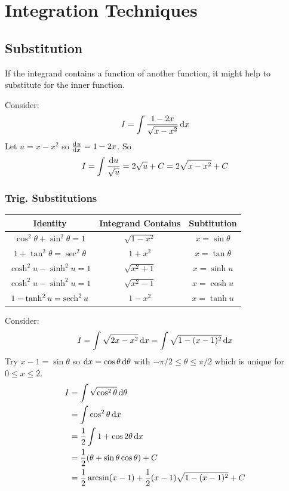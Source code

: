 \documentclass[../main.tex]{subfiles}
\begin{document}
\section{Integration Techniques}
\subsection{Substitution}
If the integrand contains a function of another function, it might help to substitute for the inner function.
\begin{example}
  Consider:
  \[
    I = \int \frac{1-2x}{\sqrt{x - x^2}} \d{x}
  \]
  Let $u = x - x^2$ so $\deriv{u}{x} = 1 - 2x$.
  So
  \[
    I = \int \frac{\d{u}}{\sqrt{u}} = 2\sqrt{u} + C = 2\sqrt{x - x^2} + C
  \]
\end{example}
\subsubsection{Trig. Substitutions}
\begin{center}
\begin{tabular}{c|c|c}
Identity & Integrand Contains & Subtitution \\
\hline
$\cos^2 \theta  + \sin^2 \theta = 1$ & $\sqrt{1-x^2}$ & $x = \sin\theta$ \\
$1 + \tan^2 \theta = \sec^2 \theta$ & $1 + x^2$ & $x = \tan \theta$ \\
$\cosh^2u - \sinh^2u = 1$ & $\sqrt{x^2 + 1}$ & $x = \sinh u$ \\
$\cosh^2u - \sinh^2u = 1$ & $\sqrt{x^2 - 1}$ & $x = \cosh u$ \\
$1-\tanh^2u = \operatorname{sech}^2u$ & $1-x^2$ & $x = \tanh u$
\end{tabular}
\end{center}
\begin{example}
  Consider:
  \[
    I = \int \sqrt{2x - x^2} \d{x} = \int \sqrt{1 - (x-1)^2} \d{x} \\
  \]
  Try $x - 1 = \sin \theta$ so $\d{x} = \cos\theta \d{\theta}$ with $-\pi/2 \leq \theta \leq \pi/2$ which is unique for $0 \leq x \leq 2$.
  \begin{align*}
    I &= \int \sqrt{\cos^2\theta} \d{\theta} \\
      &= \int \cos^2 \theta \d{x} \\
      &= \frac{1}{2} \int 1 + \cos 2\theta \d{x} \\
      &= \frac{1}{2}(\theta + \sin\theta \cos \theta) + C \\
      &= \frac{1}{2} \arcsin(x-1) + \frac{1}{2}(x-1)\sqrt{1 - (x-1)^2} + C
  \end{align*}
\end{example}
\end{document}

